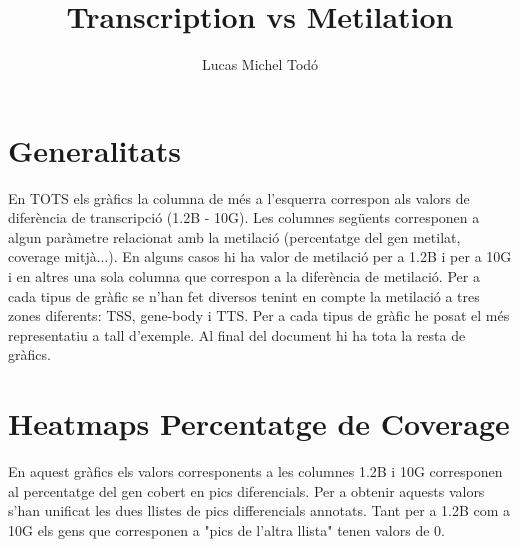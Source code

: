 \documentclass{article}\usepackage[]{graphicx}\usepackage[]{color}
\begin{document}
\title{Transcription vs Metilation}
\author{Lucas Michel Todó}
\maketitle
\tableofcontents
\clearpage



\section{Generalitats}
En TOTS els gràfics la columna de més a l'esquerra correspon als valors de diferència de transcripció (1.2B - 10G). Les columnes següents corresponen a algun paràmetre relacionat amb la metilació (percentatge del gen metilat, coverage mitjà...). En alguns casos hi ha valor de metilació per a 1.2B i per a 10G i en altres una sola columna que correspon a la diferència de metilació. Per a cada tipus de gràfic se n'han fet diversos tenint en compte la metilació a tres zones diferents: TSS, gene-body i TTS. Per a cada tipus de gràfic he posat el més representatiu a tall d'exemple. Al final del document hi ha tota la resta de gràfics.
\clearpage


\section{Heatmaps Percentatge de Coverage}
En aquest gràfics els valors corresponents a les columnes 1.2B i 10G corresponen al percentatge del gen cobert en pics diferencials. Per a obtenir aquests valors s'han unificat les dues llistes de pics differencials annotats. Tant per a 1.2B com a 10G els gens que corresponen a "pics de l'altra llista" tenen valors de 0.
\end{document}
